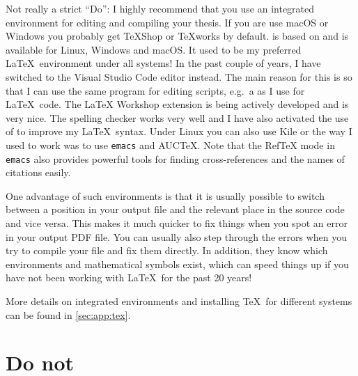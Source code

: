 Not really a strict \enquote{Do}: I highly recommend that you use an
integrated environment for editing and compiling your thesis.
If you are use macOS or Windows you probably get TeXShop or TeXworks by default.
\TeXstudio is based on \TeXmaker and is available for Linux,
Windows and macOS\@.
It used to be my preferred \LaTeX\ environment under all systems!
In the past couple of years,
I have switched to the Visual Studio Code editor instead.
The main reason for this is so that I can use the same program
for editing scripts, e.g.\ a  as I use for \LaTeX\ code.
The \textsf{LaTeX Workshop} extension is being actively developed
and is very nice.
The  spelling checker works very well
and I have also activated the use of  to improve my \LaTeX\ syntax.
Under Linux you can also use Kile or the way I used to work
was to use \texttt{emacs} and AUCTeX.
Note that the RefTeX mode in \texttt{emacs} also provides powerful
tools for finding cross-references and the names of citations easily.

One advantage of such environments is that it is usually
possible to switch between a position in your output file
and the relevant place in the source code and vice versa.
This makes it much quicker to fix
things when you spot an error in your output PDF file. You can usually
also step through the errors when you try to compile your file and fix
them directly. In addition, they know which environments and
mathematical symbols exist, which can speed things up if you have not
been working with \LaTeX\ for the past 20 years!

More details on integrated environments and installing \TeX\ for different systems can be found
in \cref{sec:app:tex}.


\section{Do not}%
\label{sec:tips:dont}

